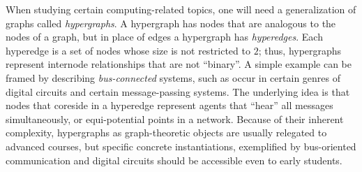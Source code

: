 When studying certain computing-related topics, one will
need a generalization of graphs called {\em hypergraphs}.  A
hypergraph has nodes that are analogous to the nodes of a graph, but
in place of edges a hypergraph has {\em hyperedges}.  Each hyperedge
is a set of nodes whose size is not restricted to $2$; thus,
hypergraphs represent internode relationships that are not ``binary''.
A simple example can be framed by describing {\em bus-connected}
systems, such as occur in certain genres of digital circuits and
certain message-passing systems.  The underlying idea is that nodes
that coreside in a hyperedge represent agents that ``hear'' all
messages simultaneously, or equi-potential points in a network.
Because of their inherent complexity, hypergraphs as graph-theoretic
objects are usually relegated to advanced courses, but specific
concrete instantiations, exemplified by bus-oriented communication and
digital circuits should be accessible even to early students.


